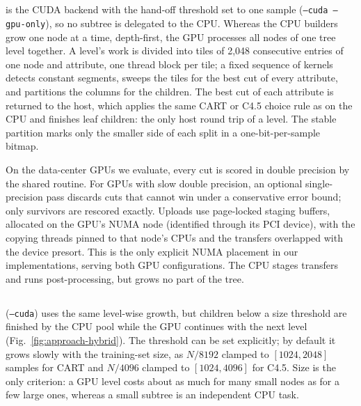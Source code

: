 \subsection{\ImplGpu}
\label{sec:impl-gpu}

\ImplGpu{} is the CUDA backend with the hand-off threshold set to one sample (\texttt{--cuda --gpu-only}), so no subtree is delegated to the CPU. Whereas the CPU builders grow one node at a time, depth-first, the GPU processes all nodes of one tree level together. A level's work is divided into tiles of 2{,}048 consecutive entries of one node and attribute, one thread block per tile; a fixed sequence of kernels detects constant segments, sweeps the tiles for the best cut of every attribute, and partitions the columns for the children. The best cut of each attribute is returned to the host, which applies the same CART or C4.5 choice rule as on the CPU and finishes leaf children: the only host round trip of a level. The stable partition marks only the smaller side of each split in a one-bit-per-sample bitmap.

On the data-center GPUs we evaluate, every cut is scored in double precision by the shared routine. For GPUs with slow double precision, an optional single-precision pass discards cuts that cannot win under a conservative error bound; only survivors are rescored exactly. Uploads use page-locked staging buffers, allocated on the GPU's NUMA node (identified through its PCI device), with the copying threads pinned to that node's CPUs and the transfers overlapped with the device presort. This is the only explicit NUMA placement in our implementations, serving both GPU configurations. The CPU stages transfers and runs post-processing, but grows no part of the tree.

\subsection{\ImplHybrid}
\label{sec:impl-hybrid}

\ImplHybrid{} (\texttt{--cuda}) uses the same level-wise growth, but children below a size threshold are finished by the CPU pool while the GPU continues with the next level (Fig.~\ref{fig:approach-hybrid}). The threshold can be set explicitly; by default it grows slowly with the training-set size, as $N/8192$ clamped to $[1024, 2048]$ samples for CART and $N/4096$ clamped to $[1024, 4096]$ for C4.5. Size is the only criterion: a GPU level costs about as much for many small nodes as for a few large ones, whereas a small subtree is an independent CPU task.

